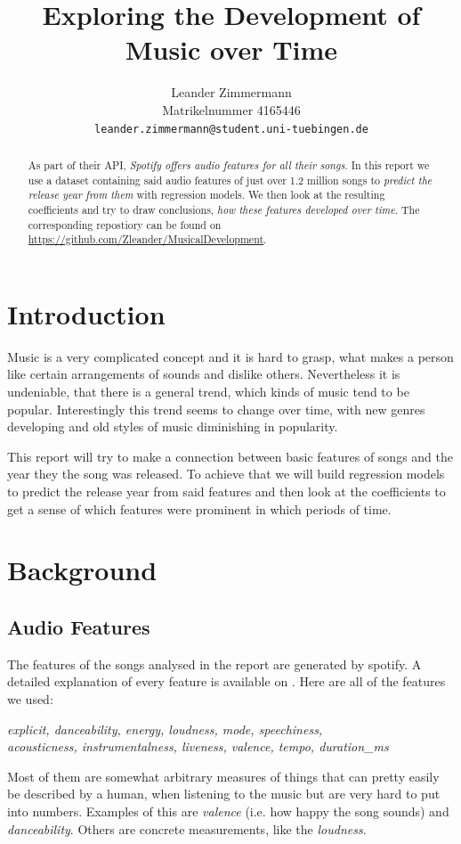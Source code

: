 \documentclass{article}
\title{Exploring the Development of Music over Time}
\author{%
  Leander Zimmermann\\
  Matrikelnummer 4165446\\
  \texttt{leander.zimmermann@student.uni-tuebingen.de} \\
}
\begin{document}
\maketitle

\begin{abstract}
    As part of their API, \emph{Spotify offers audio features for all their songs}. In this report we use a dataset containing said audio features of just over 1.2 million songs to \emph{predict the release year from them} with regression models. We then look at the resulting coefficients and try to draw conclusions, \emph{how these features developed over time}. The corresponding repostiory can be found on \url{https://github.com/Zleander/MusicalDevelopment}.
\end{abstract}

\section{Introduction}

Music is a very complicated concept and it is hard to grasp, what makes a person like certain arrangements of sounds and dislike others. Nevertheless it is undeniable, that there is a general trend, which kinds of music tend to be popular. Interestingly this trend seems to change over time, with new genres developing and old styles of music diminishing in popularity.

This report will try to make a connection between basic features of songs and the year they the song was released. To achieve that we will build regression models to predict the release year from said features and then look at the coefficients to get a sense of which features were prominent in which periods of time.

\section{Background}
\subsection{Audio Features}\label{sec:features}
The features of the songs analysed in the report are generated by spotify. A detailed explanation of every feature is available on \cite{spotify_audio_features}.
Here are all of the features we used: 
\begin{center}
  \emph{explicit, danceability, energy, loudness, mode, speechiness, \\ acousticness, instrumentalness, liveness, valence, tempo, duration\_ms}
\end{center}
Most of them are somewhat arbitrary measures of things that can pretty easily be described by a human, when listening to the music but are very hard to put into numbers. Examples of this are \emph{valence} (i.e. how happy the song sounds) and \emph{danceability}. Others are concrete measurements, like the \emph{loudness}. 
\end{document}
